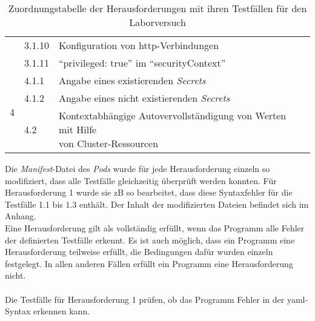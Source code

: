 \begin{table}[h]
\begin{tabularx}{\columnwidth}{lllX}
                                                                                 & 3.1.10                                                              & Konfiguration von \ac{http}-Verbindungen                                 \\
                                                                                 & 3.1.11                                                              & ``privileged: true'' im ``securityContext''                              \\
    \midrule
    \multirow{3}{*}{4}                                                           & 4.1.1                                                               & Angabe eines existierenden \textit{Secrets}                              \\
                                                                                 & 4.1.2                                                               & Angabe eines nicht existierenden \textit{Secrets}                        \\
                                                                                 & 4.2                                                                 & \makecell[l]{Kontextabhängige Autovervollständigung von Werten mit Hilfe \\ von Cluster-Ressourcen} \\

    \bottomrule
  \end{tabularx}
  \caption{Zuordnungstabelle der Herausforderungen mit ihren Testfällen für den Laborversuch}
  \label{tbl:test-cases-experiment}
\end{table}
Die \textit{Manifest}-Datei des \textit{Pods} wurde für jede Herausforderung einzeln so modifiziert, dass alle Testfälle gleichzeitig überprüft werden konnten.
Für Herausforderung 1 wurde sie \ac{zB} so bearbeitet, dass diese Syntaxfehler für die Testfälle 1.1 bis 1.3 enthält.
Der Inhalt der modifizierten Dateien befindet sich im Anhang.
\\
Eine Herausforderung gilt als vollständig erfüllt, wenn das Programm alle Fehler der definierten Testfälle erkennt.
Es ist auch möglich, dass ein Programm eine Herausforderung teilweise erfüllt, die Bedingungen dafür wurden einzeln festgelegt.
In allen anderen Fällen erfüllt ein Programm eine Herausforderung nicht.
\\\\
Die Testfälle für Herausforderung 1 prüfen, ob das Programm Fehler in der \ac{yaml}-Syntax erkennen kann.
